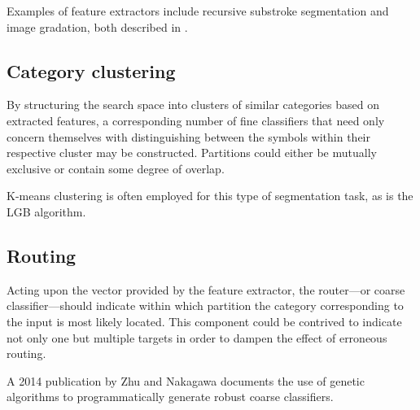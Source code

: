 \documentclass[10pt,conference,a4paper]{IEEEtran}
\begin{document}
	Examples of feature extractors include recursive substroke segmentation and image gradation, both described in \cite{tanaka1999hybrid}.



	\subsection{Category clustering}

	By structuring the search space into clusters of similar \mbox{categories} based on extracted features,
	a corresponding number of fine classifiers that need only concern themselves with distinguishing
	between the symbols within their respective cluster may be constructed.
	Partitions could either be mutually exclusive or contain some degree of overlap.

	K-means clustering is often employed for this type of segmentation task, as is the LGB algorithm. \cite{yang2003accelerating}

	


	\subsection{Routing}

	Acting upon the vector provided by the feature extractor, the router---or coarse classifier---should indicate
	within which partition the category corresponding to the input is most likely located. This component could
	be contrived to indicate not only one but multiple targets in order to dampen the effect of erroneous routing.

	A 2014 publication by Zhu and Nakagawa documents the use of genetic algorithms to programmatically generate robust coarse classifiers. \cite{zhu2014robust}
\end{document}
